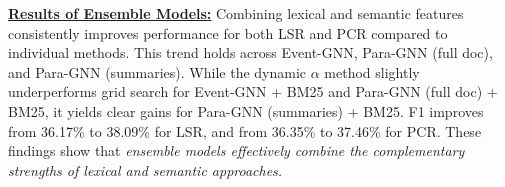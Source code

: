 \vspace{1mm}
\noindent\underline{\textbf{Results of Ensemble Models:}}
Combining lexical and semantic features consistently improves performance for both LSR and PCR compared to individual methods. This trend holds across Event-GNN, Para-GNN (full doc), and Para-GNN (summaries). While the dynamic $\alpha$ method slightly underperforms grid search for Event-GNN + BM25 and Para-GNN (full doc) + BM25, it yields clear gains for Para-GNN (summaries) + BM25. F1 improves from 36.17\% to 38.09\% for LSR, and from 36.35\% to 37.46\% for PCR. These findings show that \textit{ensemble models effectively combine the complementary strengths of lexical and semantic approaches.}



